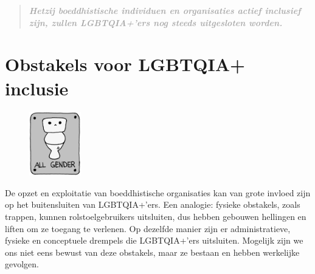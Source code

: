 \documentclass[12pt,openany]{book}
\begin{document}
\newpage
\thispagestyle{empty}
\begin{figure}[h]
    \centering
\end{figure}

\begin{quote}
\centering
\doublespacing
\textit{\Large \textbf{\textcolor{darkgray}{Hetzij boeddhistische individuen en organisaties actief inclusief zijn, zullen LGBTQIA+'ers nog steeds uitgesloten worden.}}}
\end{quote}

\chapter*{Obstakels voor LGBTQIA+ inclusie}

\begin{figure}
    \centering
    \includegraphics[width=0.2\textwidth]{16bw.png}
\end{figure}
De opzet en exploitatie van boeddhistische organisaties kan van grote invloed zijn op het buitensluiten van LGBTQIA+'ers. Een analogie: fysieke obstakels, zoals trappen, kunnen rolstoelgebruikers uitsluiten, dus hebben gebouwen hellingen en liften om ze toegang te verlenen. Op dezelfde manier zijn er administratieve, fysieke en conceptuele drempels die LGBTQIA+'ers uitsluiten. Mogelijk zijn we ons niet eens bewust van deze obstakels, maar ze bestaan en hebben werkelijke gevolgen.
\end{document}
